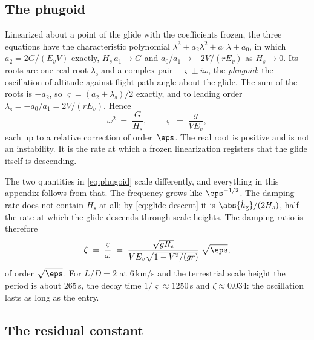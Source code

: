 \subsection{The phugoid}\label{sec:residual-phugoid}

Linearized about a point of the glide with the coefficients frozen, the
three equations have the characteristic polynomial
$\lambda^3 + a_2\lambda^2 + a_1\lambda + a_0$, in which
$a_2 = 2G/(E_vV)$ exactly, $H_s\,a_1\to G$ and $a_0/a_1\to -2V/(rE_v)$ as
$H_s\to 0$. Its roots are one real root $\lambda_{\mathrm{s}}$ and a
complex pair $-\varsigma\pm i\omega$, the \emph{phugoid}: the oscillation of
altitude against flight-path angle about the glide. The sum of the roots is
$-a_2$, so $\varsigma = (a_2 + \lambda_{\mathrm{s}})/2$ exactly, and to
leading order $\lambda_{\mathrm{s}} = -a_0/a_1 = 2V/(rE_v)$. Hence
\begin{equation}\label{eq:phugoid}
  \omega^2 \;=\; \frac{G}{H_s}, \qquad
  \varsigma \;=\; \frac{g}{V E_v},
\end{equation}
each up to a relative correction of order~$\eps$. The real root is positive
and is not an instability. It is the rate at which a frozen linearization
registers that the glide itself is descending.

The two quantities in \cref{eq:phugoid} scale differently, and everything
in this appendix follows from that. The frequency grows like
$\eps^{-1/2}$. The damping rate does not contain $H_s$ at all; by
\cref{eq:glide-descent} it is $\abs{\dot h_{\mathrm{g}}}/(2H_s)$, half the
rate at which the glide descends through scale heights. The damping ratio is
therefore
\begin{equation}\label{eq:zeta}
  \zeta \;=\; \frac{\varsigma}{\omega}
  \;=\; \frac{\sqrt{g R_e}}{V E_v\sqrt{1 - V^2/(gr)}}\;\sqrt{\eps} ,
\end{equation}
of order $\sqrt{\eps}$. For $L/D = 2$ at $6$\,km/s and the terrestrial
scale height the period is about $265$\,s, the decay time
$1/\varsigma\approx 1250$\,s and $\zeta\approx 0.034$: the oscillation
lasts as long as the entry.

\subsection{The residual constant}\label{sec:residual-constant}

